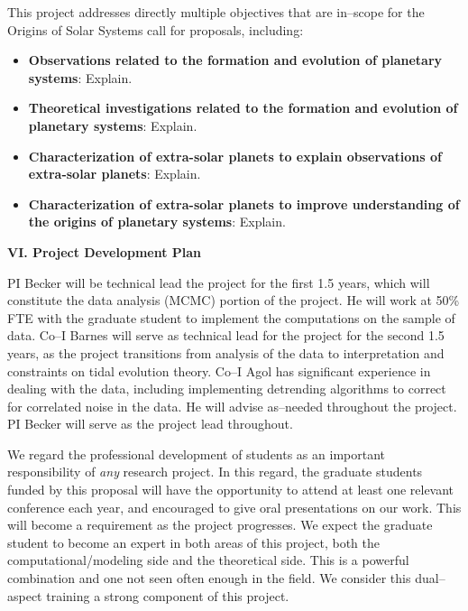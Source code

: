 This project addresses directly multiple objectives that are in--scope
for the Origins of Solar Systems call for proposals, including:
\begin{itemize}

\item {\bf Observations related to the formation and evolution of
  planetary systems}: Explain.

\item {\bf Theoretical investigations related to the formation and
  evolution of planetary systems}: Explain.

\item {\bf Characterization of extra-solar planets to explain
  observations of extra-solar planets}: Explain.

\item {\bf Characterization of extra-solar planets to improve
  understanding of the origins of planetary systems}: Explain.

\end{itemize}



\bigskip
\centerline{\bf VI. Project Development Plan}
\smallskip

PI Becker will be technical lead the project for the first 1.5 years,
which will constitute the data analysis (MCMC) portion of the project.
He will work at 50\% FTE with the graduate student to implement the
computations on the \kepler sample of data.  Co--I Barnes will serve as
technical lead for the project for the second 1.5 years, as the
project transitions from analysis of the data to interpretation and
constraints on tidal evolution theory.  Co--I Agol has significant
experience in dealing with the \kepler data, including implementing
detrending algorithms to correct for correlated noise in the \kepler
data.  He will advise as--needed throughout the project.  PI Becker
will serve as the project lead throughout.

We regard the professional development of students as an important
responsibility of {\it any} research project.  In this regard, the
graduate students funded by this proposal will have the opportunity to
attend at least one relevant conference each year, and encouraged to
give oral presentations on our work.  This will become a requirement
as the project progresses.  We expect the graduate student to become
an expert in both areas of this project, both the
computational/modeling side and the theoretical side.  This is a
powerful combination and one not seen often enough in the field.  We
consider this dual--aspect training a strong component of this
project.

